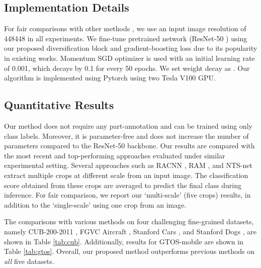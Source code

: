 \documentclass[letterpaper]{article} \usepackage{aaai20}  \usepackage{times}  \usepackage{helvet} \usepackage{courier}  \usepackage[hyphens]{url}  \usepackage{graphicx} \usepackage{multirow}
\begin{document}
\subsection{Implementation Details}
For fair comparisons with other methods \cite{nts_2018,DFL_cnn_2018}, we use an input image resolution of 448448 in all experiments. 
We fine-tune pretrained network (ResNet-50 \cite{resnet_2016}) using our proposed diversification block and gradient-boosting loss due to its popularity in existing works. Momentum SGD optimizer is used with an initial learning rate of 0.001, which decays by 0.1 for every 50 epochs. We set weight decay as . Our algorithm is implemented using Pytorch \cite{paszke2017automatic} using two Tesla V100 GPU.

\subsection{Quantitative Results}
Our method does not require any part-annotation and can be trained using only class labels. Moreover, it is parameter-free and does not  increase the number of parameters compared to the ResNet-50 backbone. Our results are compared with the most recent and top-performing approaches evaluated under similar experimental setting. Several  approaches such as RACNN \cite{racnn_2017}, RAM \cite{li2017dynamic}, and NTS-net \cite{nts_2018} extract multiple crops at different scale from an input image. The classification score obtained from these crops are averaged to predict the final class during inference. For fair comparison, we report our  `multi-scale'  (five crops)  results, in addition to the  `single-scale' using one crop from an image.

The comparisons with various methods on four challenging fine-grained datasets, namely CUB-200-2011 \cite{dataset_cub}, FGVC Aircraft \cite{dataset_aircraft}, Stanford Cars \cite{dataset_cars}, and Stanford Dogs \cite{dataset_dogs},  are shown in Table \ref{tab:cub}. Additionally, results for GTOS-mobile \cite{dataset_gtos} are shown in Table \ref{tab:gtos}.  Overall, our proposed method outperforms previous methods on \emph{all} five datasets.
\end{document}
